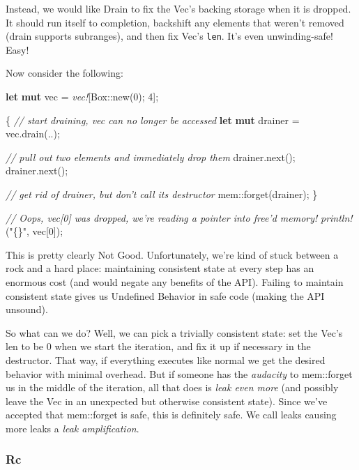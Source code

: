 \documentclass[a4paper,]{book}
\newenvironment{Shaded}{\begin{snugshade}}{\end{snugshade}}
\newcommand{\KeywordTok}[1]{\textcolor[rgb]{0.13,0.29,0.53}{\textbf{{#1}}}}
\newcommand{\DataTypeTok}[1]{\textcolor[rgb]{0.13,0.29,0.53}{{#1}}}
\newcommand{\DecValTok}[1]{\textcolor[rgb]{0.00,0.00,0.81}{{#1}}}
\newcommand{\StringTok}[1]{\textcolor[rgb]{0.31,0.60,0.02}{{#1}}}
\newcommand{\CommentTok}[1]{\textcolor[rgb]{0.56,0.35,0.01}{\textit{{#1}}}}
\newcommand{\PreprocessorTok}[1]{\textcolor[rgb]{0.56,0.35,0.01}{\textit{{#1}}}}
\newcommand{\NormalTok}[1]{{#1}}
\begin{document}
Instead, we would like Drain to fix the Vec's backing storage when it is
dropped. It should run itself to completion, backshift any elements that
weren't removed (drain supports subranges), and then fix Vec's
\texttt{len}. It's even unwinding-safe! Easy!

Now consider the following:

\begin{Shaded}
\begin{Highlighting}[]
\KeywordTok{let} \KeywordTok{mut} \NormalTok{vec = }\PreprocessorTok{vec!}\NormalTok{[}\DataTypeTok{Box}\NormalTok{::new(}\DecValTok{0}\NormalTok{); }\DecValTok{4}\NormalTok{];}

\NormalTok{\{}
    \CommentTok{// start draining, vec can no longer be accessed}
    \KeywordTok{let} \KeywordTok{mut} \NormalTok{drainer = vec.drain(..);}

    \CommentTok{// pull out two elements and immediately drop them}
    \NormalTok{drainer.next();}
    \NormalTok{drainer.next();}

    \CommentTok{// get rid of drainer, but don't call its destructor}
    \NormalTok{mem::forget(drainer);}
\NormalTok{\}}

\CommentTok{// Oops, vec[0] was dropped, we're reading a pointer into free'd memory!}
\PreprocessorTok{println!}\NormalTok{(}\StringTok{"\{\}"}\NormalTok{, vec[}\DecValTok{0}\NormalTok{]);}
\end{Highlighting}
\end{Shaded}

This is pretty clearly Not Good. Unfortunately, we're kind of stuck
between a rock and a hard place: maintaining consistent state at every
step has an enormous cost (and would negate any benefits of the API).
Failing to maintain consistent state gives us Undefined Behavior in safe
code (making the API unsound).

So what can we do? Well, we can pick a trivially consistent state: set
the Vec's len to be 0 when we start the iteration, and fix it up if
necessary in the destructor. That way, if everything executes like
normal we get the desired behavior with minimal overhead. But if someone
has the \emph{audacity} to mem::forget us in the middle of the
iteration, all that does is \emph{leak even more} (and possibly leave
the Vec in an unexpected but otherwise consistent state). Since we've
accepted that mem::forget is safe, this is definitely safe. We call
leaks causing more leaks a \emph{leak amplification}.

\subsubsection{Rc}\label{rc}
\end{document}
